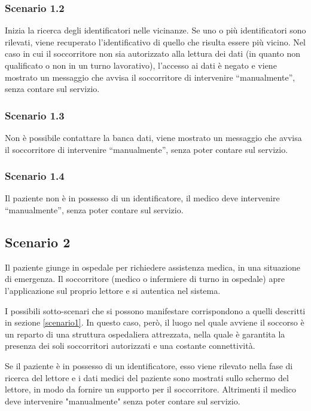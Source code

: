 \documentclass[a4paper,12pt]{report}
\begin{document}
\subsubsection*{Scenario 1.2}
Inizia la ricerca degli identificatori nelle vicinanze. Se uno o più identificatori sono rilevati, viene recuperato l'identificativo di quello che risulta essere più vicino. Nel caso in cui il soccorritore non sia autorizzato alla lettura dei dati (in quanto non qualificato o non in un turno lavorativo), l'accesso ai dati è negato e viene mostrato un messaggio che avvisa il soccorritore di intervenire ``manualmente'', senza contare sul servizio.
\subsubsection*{Scenario 1.3} 
Non è possibile contattare la banca dati, viene mostrato un messaggio che avvisa il soccorritore di intervenire ``manualmente'', senza poter contare sul servizio.
\subsubsection*{Scenario 1.4}
Il paziente non è in possesso di un identificatore, il medico deve intervenire  ``manualmente'', senza poter contare sul servizio.

\subsection{Scenario 2}
Il paziente giunge in ospedale per richiedere assistenza medica, in una situazione di emergenza. Il soccorritore (medico o infermiere di turno in ospedale) apre l'applicazione sul proprio lettore e si autentica nel sistema. 

I possibili sotto-scenari che si possono manifestare corrispondono a quelli descritti in sezione \ref{scenario1}. In questo caso, però, il luogo nel quale avviene il soccorso è un reparto di una struttura ospedaliera attrezzata, nella quale è garantita la presenza dei soli soccorritori autorizzati e una costante connettività. 

Se il paziente è in possesso di un identificatore, esso viene rilevato nella fase di ricerca del lettore e i dati medici del paziente sono mostrati sullo schermo del lettore, in modo da fornire un supporto per il soccorritore. Altrimenti il medico deve intervenire "manualmente" senza poter contare sul servizio.
\end{document}
